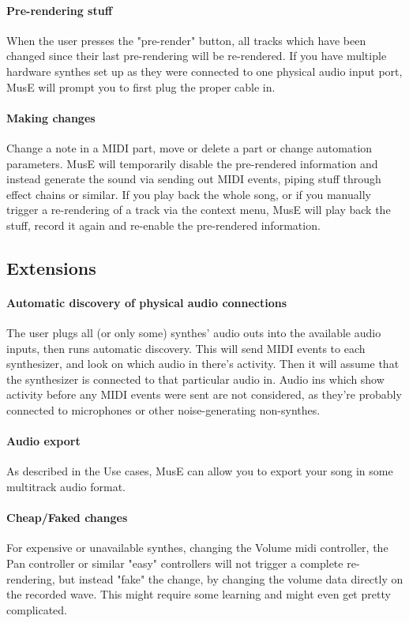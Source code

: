 \documentclass[a4paper]{report}
\begin{document}
\paragraph{Pre-rendering stuff}
When the user presses the "pre-render" button, all tracks which have
been changed since their last pre-rendering will be re-rendered.
If you have multiple hardware synthes set up as they were connected
to one physical audio input port, MusE will prompt you to first plug
the proper cable in.

\paragraph{Making changes}
Change a note in a MIDI part, move or delete a part or change automation
parameters. MusE will temporarily disable the pre-rendered information
and instead generate the sound via sending out MIDI events, piping stuff
through effect chains or similar. If you play back the whole song, or
if you manually trigger a re-rendering of a track via the context menu,
MusE will play back the stuff, record it again and re-enable the
pre-rendered information.


\subsection{Extensions}
\paragraph{Automatic discovery of physical audio connections}
The user plugs all (or only some) synthes' audio outs into the available
audio inputs, then runs automatic discovery. This will send MIDI events
to each synthesizer, and look on which audio in there's activity. Then
it will assume that the synthesizer is connected to that particular
audio in. Audio ins which show activity before any MIDI events were
sent are not considered, as they're probably connected to microphones
or other noise-generating non-synthes.

\paragraph{Audio export}
As described in the Use cases, MusE can allow you to export your song
in some multitrack audio format.

\paragraph{Cheap/Faked changes}
For expensive or unavailable synthes, changing the Volume midi controller,
the Pan controller or similar "easy" controllers will not trigger a
complete re-rendering, but instead "fake" the change, by changing
the volume data directly on the recorded wave. This might require some
learning and might even get pretty complicated.
\end{document}
